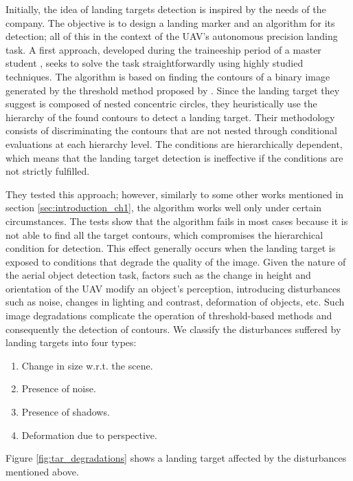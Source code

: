 Initially, the idea of landing targets detection is inspired by the needs of the \cite{Internest:WebPage:} company. The objective is to design a landing marker and an algorithm for its detection; all of this in the context of the UAV's autonomous precision landing task. A first approach, developed during the traineeship period of a master student \citep{BaquedanoA.:ESIEE:2017}, seeks to solve the task straightforwardly using highly studied techniques. The algorithm is based on finding the contours of a binary image generated by the threshold method proposed by \cite{Otsu:SMC:1979}. Since the landing target they suggest is composed of nested concentric circles, they heuristically use the hierarchy of the found contours to detect a landing target. Their methodology consists of discriminating the contours that are not nested through conditional evaluations at each hierarchy level. The conditions are hierarchically dependent, which means that the landing target detection is ineffective if the conditions are not strictly fulfilled.

They tested this approach; however, similarly to some other works mentioned in section \ref{sec:introduction_ch1}, the algorithm works well only under certain circumstances. The tests show that the algorithm fails in most cases because it is not able to find all the target contours, which compromises the hierarchical condition for detection. This effect generally occurs when the landing target is exposed to conditions that degrade the quality of the image. Given the nature of the aerial object detection task, factors such as the change in height and orientation of the UAV modify an object's perception, introducing disturbances such as noise, changes in lighting and contrast, deformation of objects, etc. Such image degradations complicate the operation of threshold-based methods and consequently the detection of contours. We classify the disturbances suffered by landing targets into four types: 

\begin{enumerate}
	\item Change in size w.r.t. the scene.
	\item Presence of noise.
	\item Presence of shadows.
	\item Deformation due to perspective.
\end{enumerate}
Figure \ref{fig:tar_degradations} shows a landing target affected by the disturbances mentioned above.

